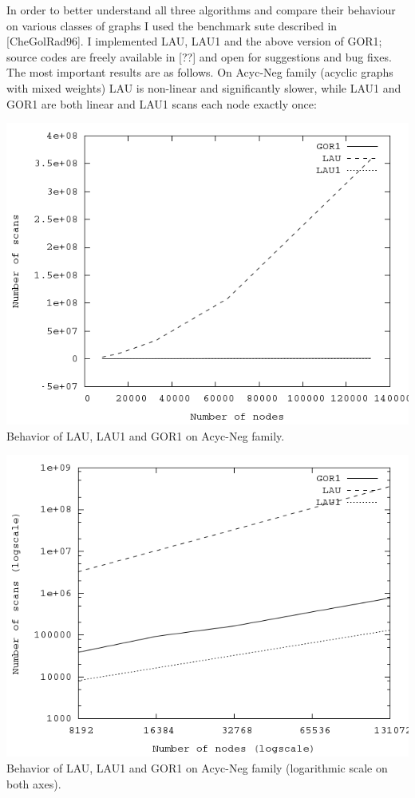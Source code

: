 \documentclass{article}
\theoremstyle{definition}
\begin{document}
\begin{multicols}{2}
In order to better understand all three algorithms and compare their behaviour on various classes of graphs
I used the benchmark sute described in [CheGolRad96].
I implemented LAU, LAU1 and the above version of GOR1;
source codes are freely available in [??] and open for suggestions and bug fixes.
The most important results are as follows.
On Acyc-Neg family (acyclic graphs with mixed weights)
LAU is non-linear and significantly slower,
while LAU1 and GOR1 are both linear and LAU1 scans each node exactly once:

\begin{center}
\includegraphics[width=\linewidth]{img/plot_acyc_neg.png}
\nolinebreak[4]
\\\footnotesize{Behavior of LAU, LAU1 and GOR1 on Acyc-Neg family.}
\end{center}

\begin{center}
\includegraphics[width=\linewidth]{img/plot_acyc_neg_logscale.png}
\nolinebreak[4]
\\\footnotesize{Behavior of LAU, LAU1 and GOR1 on Acyc-Neg family (logarithmic scale on both axes).}
\end{center}


\end{multicols}
\end{document}
